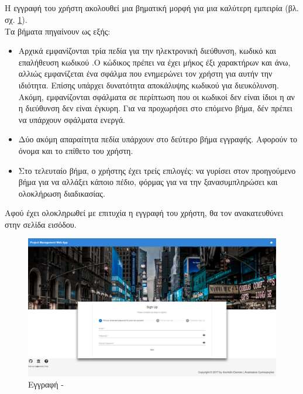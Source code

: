 \subsection*{}
\pSpace Η εγγραφή του χρήστη ακολουθεί μια βηματική μορφή για μια καλύτερη εμπειρία (βλ. σχ. \ref{fig:register}).\\
\pSpace Τα βήματα πηγαίνουν ως εξής:\\
\begin{itemize}
	\item Αρχικά εμφανίζονται τρία πεδία για την ηλεκτρονική διεύθυνση, κωδικό και επαλήθευση κωδικού .Ο κώδικος πρέπει να έχει μήκος έξι χαρακτήρων και άνω, αλλιώς εμφανίζεται ένα σφάλμα που ενημερώνει τον χρήστη για αυτήν την ιδιότητα. Επίσης υπάρχει δυνατότητα αποκάλυψης κωδικού για διευκόλυνση. Ακόμη, εμφανίζονται σφάλματα σε περίπτωση που οι κωδικοί δεν είναι ίδιοι η αν η διεύθυνση δεν είναι έγκυρη. Για να προχωρήσει στο επόμενο βήμα, δέν πρέπει να υπάρχουν σφάλματα ενεργά.
	\item Δύο ακόμη απαραίτητα πεδία υπάρχουν στο δεύτερο βήμα εγγραφής. Αφορούν το όνομα και το επίθετο του χρήστη.
	\item Στο τελευταίο βήμα, ο χρήστης έχει τρείς επιλογές: να γυρίσει στον προηγούμενο βήμα για να αλλάξει κάποιο πέδιο,  φόρμας για να την ξανασυμπληρώσει και ολοκλήρωση διαδικασίας.
\end{itemize}
\pSpace Αφού έχει ολοκληρωθεί με επιτυχία η εγγραφή του χρήστη, θα τον ανακατευθύνει στην σελίδα εισόδου.

\begin{figure}[!htb]
\centering
\includegraphics[scale=0.2]{images/register.png}
\caption{Εγγραφή - }
\label{fig:register}
\end{figure}

